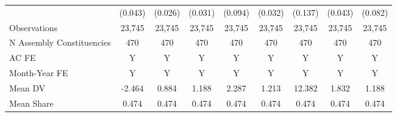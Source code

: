 {\begin{tabular}{l*{8}{c}}
            &     (0.043)         &     (0.026)         &     (0.031)         &     (0.094)         &     (0.032)         &     (0.137)         &     (0.043)         &     (0.082)         \\
Observations&      23,745         &      23,745         &      23,745         &      23,745         &      23,745         &      23,745         &      23,745         &      23,745         \\
N Assembly Constituencies&         470         &         470         &         470         &         470         &         470         &         470         &         470         &         470         \\
AC FE       &           Y         &           Y         &           Y         &           Y         &           Y         &           Y         &           Y         &           Y         \\
Month-Year FE&           Y         &           Y         &           Y         &           Y         &           Y         &           Y         &           Y         &           Y         \\
Mean DV     &      -2.464         &       0.884         &       1.188         &       2.287         &       1.213         &      12.382         &       1.832         &       1.188         \\
Mean Share  &       0.474         &       0.474         &       0.474         &       0.474         &       0.474         &       0.474         &       0.474         &       0.474         \\
\bottomrule
\end{tabular}
}
